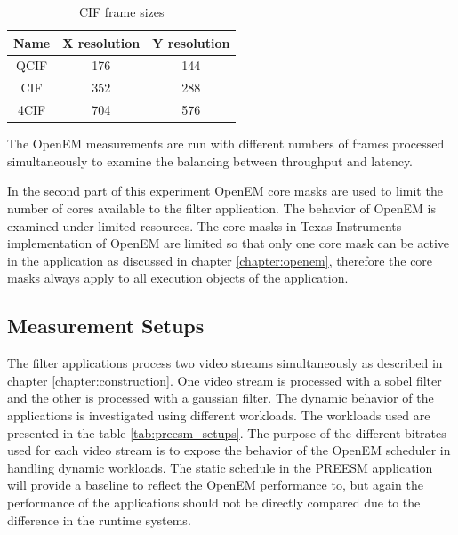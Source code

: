 \begin{table}
    \begin{center}
        \begin{tabular}{ c c c }
            Name  & X resolution  & Y resolution \\ \hline
            QCIF  & 176           & 144          \\ \hline
            CIF   & 352           & 288          \\ \hline
            4CIF  & 704           & 576          \\ \hline
        \end{tabular}
        \caption{CIF frame sizes}
        \label{tab:cif_frames}
    \end{center}
\end{table}

 The OpenEM measurements are run with different numbers of frames processed simultaneously to examine the balancing between throughput and latency.

In the second part of this experiment OpenEM core masks are used to limit the number of cores available to the filter application. The behavior of OpenEM is examined under limited resources. The core masks in Texas Instruments implementation of OpenEM are limited so that only one core mask can be active in the application as discussed in chapter \ref{chapter:openem}, therefore the core masks always apply to all execution objects of the application. 

\subsection{Measurement Setups}
The filter applications process two video streams simultaneously as described in chapter \ref{chapter:construction}. One video stream is processed with a sobel filter and the other is processed with a gaussian filter. The dynamic behavior of the applications is investigated using different workloads. The workloads used are presented in the table \ref{tab:preesm_setups}. The purpose of the different bitrates used for each video stream is to expose the behavior of the OpenEM scheduler in handling dynamic workloads. The static schedule in the PREESM application will provide a baseline to reflect the OpenEM performance to, but again the performance of the applications should not be directly compared due to the difference in the runtime systems.

